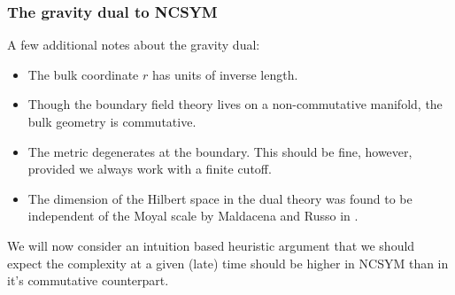 \documentclass[8pt,aspectratio=169]{beamer}
\begin{document}
\begin{frame}
\frametitle{The gravity dual to NCSYM}

A few additional notes about the gravity dual:

\begin{itemize}

\item The bulk coordinate $r$ has units of inverse length.

\item Though the boundary field theory lives on a non-commutative manifold, the bulk geometry is commutative.

\item The metric degenerates at the boundary. This should be fine, however, provided we always work with a finite cutoff.

\item The dimension of the Hilbert space in the dual theory was found to be independent of the Moyal scale by Maldacena and Russo in \cite{Maldacena:1999mh}.

\end{itemize}

We will now consider an intuition based heuristic argument that we should expect the complexity at a given (late) time should be higher in NCSYM than in it's commutative counterpart.

\end{frame}
\end{document}
